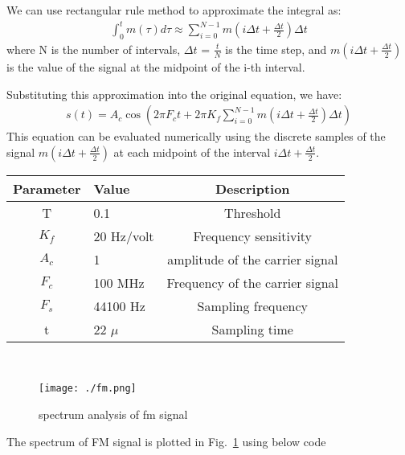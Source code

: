 \documentclass[journal,5pt,twocolumn]{IEEEtran}
\newcommand\figref{Fig.~\ref}
\begin{document}
\begin{enumerate}
 \fi
 
We can use rectangular rule method to approximate the integral as:
\begin{align}
\int_{0}^t m(\tau) d\tau \approx \sum_{i=0}^{N-1} m\left(i \Delta t + \frac{\Delta t}{2}\right) \Delta t
\end{align}
where N is the number of intervals, $\Delta t$ = $\frac{t}{N}$ is the time step, and $m\left(i \Delta t + \frac{\Delta t}{2}\right)$ is the value of the signal at the midpoint of the i-th interval.

Substituting this approximation into the original equation, we have:
\begin{align}
s(t) = A_c \cos \left(2 \pi F_c t +2\pi K_{f} \sum_{i=0}^{N-1} m\left(i \Delta t + \frac{\Delta t}{2}\right) \Delta t\right)
\end{align}
This equation can be evaluated numerically using the discrete samples of the signal $m\left(i \Delta t + \frac{\Delta t}{2}\right)$ at each midpoint of the interval $i\Delta t + \frac{\Delta t}{2}. $
 
 
 
 
    \begin{tabular}{|c|l|c|}
    \hline 
    \textbf{Parameter} & \textbf{Value} &\textbf{Description} \\ \hline
    T&0.1&Threshold\\
    $K_{f}$ & 20 Hz/volt & Frequency sensitivity \\ 
    $A_c$ & 1  & amplitude of the carrier signal\\ 
    $F_c $& 100 MHz & Frequency of the carrier signal\\ 
    $F_s$ & 44100 Hz & Sampling frequency\\ 
    t     & 22 $\mu$ & Sampling time\\  \hline
    \end{tabular}
    \\



       
\iffalse
 \begin{align*}
K_{f} = \frac{\Delta f}{A_m} 
 \end{align*}
 \fi
 \begin{figure}
\centering 
\texttt{[image: ./fm.png]}
\caption{spectrum analysis of fm signal}
\label{fig:fm_spectrum}
\end{figure}

The spectrum of FM signal is plotted in \figref{fig:fm_spectrum} using below code
\begin{center}
\end{center}



\end{enumerate}
\end{document}
